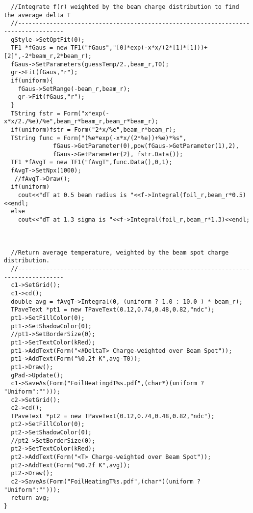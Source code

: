 \documentclass[12pt]{article}
\begin{document}
\begin{lstlisting}
  //Integrate f(r) weighted by the beam charge distribution to find the average delta T 
  //-----------------------------------------------------------------------------------
  gStyle->SetOptFit(0);
  TF1 *fGaus = new TF1("fGaus","[0]*exp(-x*x/(2*[1]*[1]))+[2]",-2*beam_r,2*beam_r);
  fGaus->SetParameters(guessTemp/2.,beam_r,T0);
  gr->Fit(fGaus,"r");
  if(uniform){
    fGaus->SetRange(-beam_r,beam_r);
    gr->Fit(fGaus,"r");
  }
  TString fstr = Form("x*exp(-x*x/2./%e)/%e",beam_r*beam_r,beam_r*beam_r);
  if(uniform)fstr = Form("2*x/%e",beam_r*beam_r);
  TString func = Form("(%e*exp(-x*x/(2*%e))+%e)*%s",
		      fGaus->GetParameter(0),pow(fGaus->GetParameter(1),2),
		      fGaus->GetParameter(2), fstr.Data());
  TF1 *fAvgT = new TF1("fAvgT",func.Data(),0,1);
  fAvgT->SetNpx(1000);
   //fAvgT->Draw();
  if(uniform)
    cout<<"dT at 0.5 beam radius is "<<f->Integral(foil_r,beam_r*0.5)<<endl;
  else
    cout<<"dT at 1.3 sigma is "<<f->Integral(foil_r,beam_r*1.3)<<endl;

  

  //Return average temperature, weighted by the beam spot charge distribution.
  //-----------------------------------------------------------------------------------
  c1->SetGrid();
  c1->cd();
  double avg = fAvgT->Integral(0, (uniform ? 1.0 : 10.0 ) * beam_r);
  TPaveText *pt1 = new TPaveText(0.12,0.74,0.48,0.82,"ndc");
  pt1->SetFillColor(0);
  pt1->SetShadowColor(0);
  //pt1->SetBorderSize(0);
  pt1->SetTextColor(kRed);
  pt1->AddText(Form("<#DeltaT> Charge-weighted over Beam Spot"));
  pt1->AddText(Form("%0.2f K",avg-T0));
  pt1->Draw();
  gPad->Update();
  c1->SaveAs(Form("FoilHeatingdT%s.pdf",(char*)(uniform ? "Uniform":"")));
  c2->SetGrid();
  c2->cd();
  TPaveText *pt2 = new TPaveText(0.12,0.74,0.48,0.82,"ndc");
  pt2->SetFillColor(0);
  pt2->SetShadowColor(0);
  //pt2->SetBorderSize(0);
  pt2->SetTextColor(kRed);
  pt2->AddText(Form("<T> Charge-weighted over Beam Spot"));
  pt2->AddText(Form("%0.2f K",avg));
  pt2->Draw();
  c2->SaveAs(Form("FoilHeatingT%s.pdf",(char*)(uniform ? "Uniform":"")));
  return avg;
}

\end{lstlisting}
\end{document}

